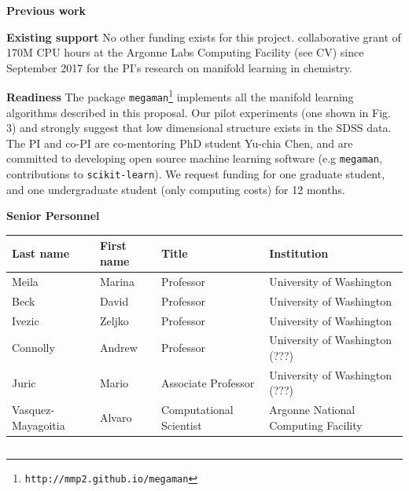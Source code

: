 \documentclass[floatfix,11pt]{revtex4}
\begin{document}


{\bf Previous work}

{\bf Existing support} No other funding exists for this project. collaborative grant of 170M CPU hours at the Argonne Labs Computing Facility (see CV) since September 2017 for the PI's research on manifold learning in chemistry.

{\bf Readiness} The package {\tt megaman}\footnote{{\tt http://mmp2.github.io/megaman}} \cite{mcqueenMVdpZ:megaman16,*mcqueenMVdpZ:megaman-jmlr16} implements all the manifold learning algorithms described in this proposal. Our pilot experiments (one shown in Fig. 3) and \cite{Yip04} strongly suggest that low dimensional structure exists in the SDSS data. The PI and co-PI are co-mentoring PhD student Yu-chia Chen, and are committed to developing open source machine learning software (e.g {\tt megaman}, contributions to {\tt scikit-learn}). We request funding for one graduate student, and one undergraduate student (only computing costs) for 12 months.



\vspace{-2.1em}



\vspace{0.6em}

\vspace{0.6em}

\newpage
\centerline{\textbf{Senior Personnel}}
\begin{tabular}{llll}
  Last name & First name & Title & Institution\\
  \hline
Meila & Marina & Professor & University of Washington\\
Beck & David & Professor &  University of Washington\\
Ivezic & Zeljko & Professor &  University of Washington \\
Connolly & Andrew & Professor &  University of Washington (???)\\
Juric & Mario & Associate Professor &  University of Washington (???)\\
Vasquez-Mayagoitia & Alvaro & Computational Scientist & Argonne National Computing Facility\\
\end{tabular}

\vspace{0.4em}
\begin{tabular}{llll}

\end{tabular}
\end{document}
